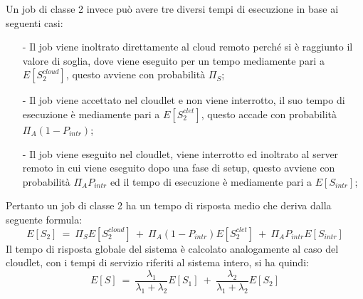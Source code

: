 Un job di classe 2 invece può avere tre diversi tempi di esecuzione in base ai
seguenti casi:
\begin{itemize}
\item[-]Il job viene inoltrato direttamente al cloud remoto perché si è
raggiunto il valore di soglia, dove viene eseguito per un tempo mediamente pari
a $E[S_2^{cloud}]$, questo avviene con probabilità $\Pi_S$;
\item[-]Il job viene accettato nel cloudlet e non viene interrotto, il suo tempo
di esecuzione è mediamente pari a $E[S_2^{clet}]$, questo accade con probabilità
$\Pi_A (1 - P_{intr})$;
\item[-]Il job viene eseguito nel cloudlet, viene interrotto ed inoltrato al
server remoto in cui viene eseguito dopo una fase di setup, questo avviene con
probabilità $\Pi_A P_{intr}$ ed il tempo di esecuzione è mediamente pari a 
$E[S_{intr}]$; 
\end{itemize}
Pertanto un job di classe 2 ha un tempo di risposta medio che deriva dalla
seguente formula:
\begin{equation}
E[S_2] \ = \
\Pi_S E[S_2^{cloud}] \ + \ \Pi_A (1-P_{intr}) E[S_2^{clet}] \ + \ 
\Pi_A P_{intr} E[S_{intr}]
\end{equation}
Il tempo di risposta globale del sistema è calcolato analogamente al caso del
cloudlet, con i tempi di servizio riferiti al sistema intero, si ha quindi:
\begin{equation}
E[S] \ = \
\frac{\lambda_1}{\lambda_1+\lambda_2}  E[S_1] \ + \
\frac{\lambda_2}{\lambda_1+\lambda_2}  E[S_2] 
\end{equation}
